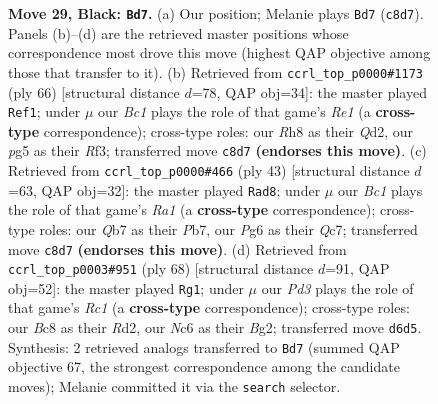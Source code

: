 \documentclass[11pt]{article}
\begin{document}
\begin{figure}[p]
\caption{\textbf{Move 29, Black: \texttt{Bd7}.} (a) Our position; Melanie plays \texttt{Bd7} (\texttt{c8d7}). Panels (b)--(d) are the retrieved master positions whose correspondence most drove this move (highest QAP objective among those that transfer to it). (b) Retrieved from \texttt{ccrl\_top\_p0000\#1173} (ply 66) [structural distance $d$=78, QAP obj=34]: the master played \texttt{Ref1}; under $\mu$ our \emph{Bc1} plays the role of that game's \emph{Re1} (a \textbf{cross-type} correspondence); cross-type roles: our \emph{R}h8 as their \emph{Q}d2, our \emph{p}g5 as their \emph{R}f3; transferred move \texttt{c8d7} \textbf{(endorses this move)}. (c) Retrieved from \texttt{ccrl\_top\_p0000\#466} (ply 43) [structural distance $d$=63, QAP obj=32]: the master played \texttt{Rad8}; under $\mu$ our \emph{Bc1} plays the role of that game's \emph{Ra1} (a \textbf{cross-type} correspondence); cross-type roles: our \emph{Q}b7 as their \emph{P}b7, our \emph{P}g6 as their \emph{Q}c7; transferred move \texttt{c8d7} \textbf{(endorses this move)}. (d) Retrieved from \texttt{ccrl\_top\_p0003\#951} (ply 68) [structural distance $d$=91, QAP obj=52]: the master played \texttt{Rg1}; under $\mu$ our \emph{Pd3} plays the role of that game's \emph{Rc1} (a \textbf{cross-type} correspondence); cross-type roles: our \emph{B}c8 as their \emph{R}d2, our \emph{N}c6 as their \emph{B}g2; transferred move \texttt{d6d5}. Synthesis: 2 retrieved analogs transferred to \texttt{Bd7} (summed QAP objective 67, the strongest correspondence among the candidate moves); Melanie committed it via the \texttt{search} selector.}
\label{fig:thought-m57}
\end{figure}

\clearpage
\end{document}
